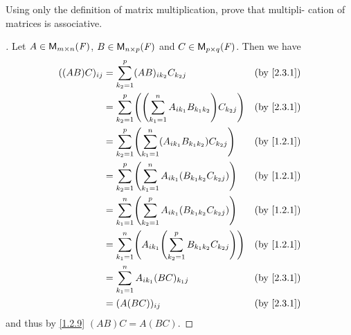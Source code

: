 \begin{ex}\label{ex:2.3.18}
  Using only the definition of matrix multiplication, prove that multipli- cation of matrices is associative.
\end{ex}

\begin{proof}[]
  Let \(A \in \mathsf{M}_{{m} \times n}({\mathit{F}})\), \(B \in \mathsf{M}_{{n} \times p}({\mathit{F}})\) and \(C \in \mathsf{M}_{{p} \times q}({\mathit{F}})\).
  Then we have
  \begin{align*}
    ((AB) C)_{i j} & = \sum_{k_2 = 1}^p (AB)_{i k_2} C_{k_2 j}                                     &  & \text{(by \cref{2.3.1})} \\
                   & = \sum_{k_2 = 1}^p \pa{\pa{\sum_{k_1 = 1}^n A_{i k_1} B_{k_1 k_2}} C_{k_2 j}} &  & \text{(by \cref{2.3.1})} \\
                   & = \sum_{k_2 = 1}^p \pa{\sum_{k_1 = 1}^n (A_{i k_1} B_{k_1 k_2}) C_{k_2 j}}    &  & \text{(by \cref{1.2.1})} \\
                   & = \sum_{k_2 = 1}^p \pa{\sum_{k_1 = 1}^n A_{i k_1} (B_{k_1 k_2} C_{k_2 j})}    &  & \text{(by \cref{1.2.1})} \\
                   & = \sum_{k_1 = 1}^n \pa{\sum_{k_2 = 1}^p A_{i k_1} (B_{k_1 k_2} C_{k_2 j})}    &  & \text{(by \cref{1.2.1})} \\
                   & = \sum_{k_1 = 1}^n \pa{A_{i k_1} \pa{\sum_{k_2 = 1}^p B_{k_1 k_2} C_{k_2 j}}} &  & \text{(by \cref{1.2.1})} \\
                   & = \sum_{k_1 = 1}^n A_{i k_1} (BC)_{k_1 j}                                     &  & \text{(by \cref{2.3.1})} \\
                   & = (A (BC))_{i j}                                                              &  & \text{(by \cref{2.3.1})}
  \end{align*}
  and thus by \cref{1.2.9} \((AB) C = A (BC)\).
\end{proof}
